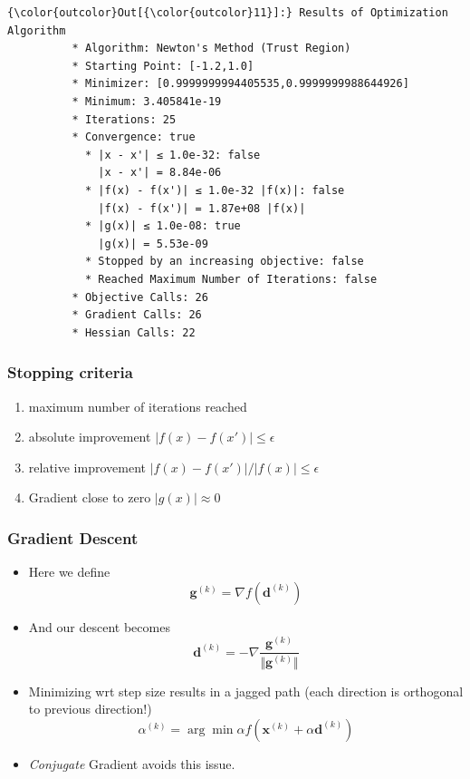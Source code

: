 \documentclass[11pt]{article}
\providecommand{\tightlist}{%
      \setlength{\itemsep}{0pt}\setlength{\parskip}{0pt}}
\begin{document}
\begin{Verbatim}[commandchars=\\\{\}]
{\color{outcolor}Out[{\color{outcolor}11}]:} Results of Optimization Algorithm
          * Algorithm: Newton's Method (Trust Region)
          * Starting Point: [-1.2,1.0]
          * Minimizer: [0.9999999994405535,0.9999999988644926]
          * Minimum: 3.405841e-19
          * Iterations: 25
          * Convergence: true
            * |x - x'| ≤ 1.0e-32: false 
              |x - x'| = 8.84e-06 
            * |f(x) - f(x')| ≤ 1.0e-32 |f(x)|: false
              |f(x) - f(x')| = 1.87e+08 |f(x)|
            * |g(x)| ≤ 1.0e-08: true 
              |g(x)| = 5.53e-09 
            * Stopped by an increasing objective: false
            * Reached Maximum Number of Iterations: false
          * Objective Calls: 26
          * Gradient Calls: 26
          * Hessian Calls: 22
\end{Verbatim}
            
    \subsubsection{Stopping criteria}\label{stopping-criteria}

\begin{enumerate}
\def\labelenumi{\arabic{enumi}.}
\tightlist
\item
  maximum number of iterations reached
\item
  absolute improvement \(|f(x) - f(x')| \leq \epsilon\)
\item
  relative improvement \(|f(x) - f(x')| / |f(x)| \leq \epsilon\)
\item
  Gradient close to zero \(|g(x)| \approx 0\)
\end{enumerate}

    \subsubsection{Gradient Descent}\label{gradient-descent}

\begin{itemize}
\tightlist
\item
  Here we define \[\mathbf{g}^{(k)} = \nabla f(\mathbf{d}^{(k)})\]
\item
  And our descent becomes
  \[\mathbf{d}^{(k)} = -\nabla \frac{\mathbf{g}^{(k)} }{\Vert\mathbf{g}^{(k)}\Vert }\]
\item
  Minimizing wrt step size results in a jagged path (each direction is
  orthogonal to previous direction!)
  \[\alpha^{(k)} = \arg \min{\alpha} f(\mathbf{x}^{(k)} + \alpha \mathbf{d}^{(k)}) \]
\item
  \emph{Conjugate} Gradient avoids this issue.
\end{itemize}
\end{document}
